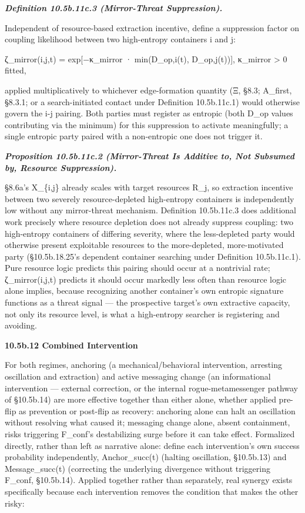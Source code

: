 \documentclass[
]{article}
\begin{document}
\emph{\textbf{Definition 10.5b.11c.3 (Mirror-Threat Suppression).}}

Independent of resource-based extraction incentive, define a suppression
factor on coupling likelihood between two high-entropy containers i and
j:

ζ\_mirror(i,j,t) = exp{[}−κ\_mirror · min(D\_op,i(t), D\_op,j(t)){]},
κ\_mirror \textgreater{} 0 fitted,

applied multiplicatively to whichever edge-formation quantity (Ξ, §8.3;
A\_first, §8.3.1; or a search-initiated contact under Definition
10.5b.11c.1) would otherwise govern the i-j pairing. Both parties must
register as entropic (both D\_op values contributing via the minimum)
for this suppression to activate meaningfully; a single entropic party
paired with a non-entropic one does not trigger it.

\emph{\textbf{Proposition 10.5b.11c.2 (Mirror-Threat Is Additive to, Not
Subsumed by, Resource Suppression).}}

§8.6a's X\_\{i,j\} already scales with target resources R\_j, so
extraction incentive between two severely resource-depleted high-entropy
containers is independently low without any mirror-threat mechanism.
Definition 10.5b.11c.3 does additional work precisely where resource
depletion does not already suppress coupling: two high-entropy
containers of differing severity, where the less-depleted party would
otherwise present exploitable resources to the more-depleted,
more-motivated party (§10.5b.18.25's dependent container searching under
Definition 10.5b.11c.1). Pure resource logic predicts this pairing
should occur at a nontrivial rate; ζ\_mirror(i,j,t) predicts it should
occur markedly less often than resource logic alone implies, because
recognizing another container's own entropic signature functions as a
threat signal --- the prospective target's own extractive capacity, not
only its resource level, is what a high-entropy searcher is registering
and avoiding.

\textbf{10.5b.12 Combined Intervention}

For both regimes, anchoring (a mechanical/behavioral intervention,
arresting oscillation and extraction) and active messaging change (an
informational intervention --- external correction, or the internal
rogue-metamessenger pathway of §10.5b.14) are more effective together
than either alone, whether applied pre-flip as prevention or post-flip
as recovery: anchoring alone can halt an oscillation without resolving
what caused it; messaging change alone, absent containment, risks
triggering F\_conf's destabilizing surge before it can take effect.
Formalized directly, rather than left as narrative alone: define each
intervention's own success probability independently, Anchor\_succ(t)
(halting oscillation, §10.5b.13) and Message\_succ(t) (correcting the
underlying divergence without triggering F\_conf, §10.5b.14). Applied
together rather than separately, real synergy exists specifically
because each intervention removes the condition that makes the other
risky:
\end{document}
